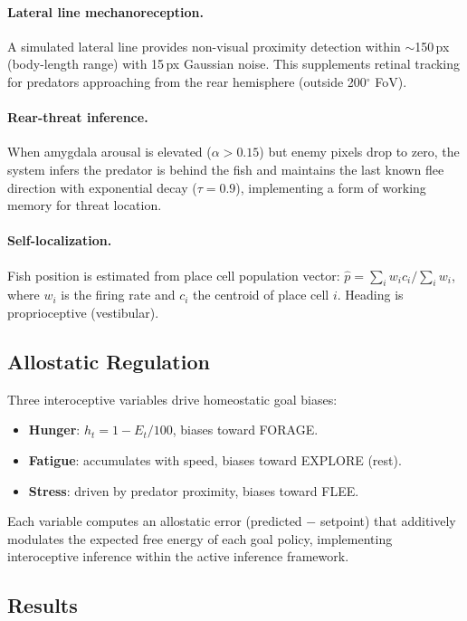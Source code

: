 \documentclass[9pt]{elife}
\begin{document}
\paragraph{Lateral line mechanoreception.}
A simulated lateral line provides non-visual proximity detection within
$\sim$150\,px (body-length range) with 15\,px Gaussian noise.
This supplements retinal tracking for predators approaching from
the rear hemisphere (outside 200$^\circ$ FoV).

\paragraph{Rear-threat inference.}
When amygdala arousal is elevated ($\alpha > 0.15$) but enemy pixels
drop to zero, the system infers the predator is behind the fish and
maintains the last known flee direction with exponential decay
($\tau = 0.9$), implementing a form of working memory for threat location.

\paragraph{Self-localization.}
Fish position is estimated from place cell population vector:
$\hat{p} = \sum_i w_i c_i / \sum_i w_i$,
where $w_i$ is the firing rate and $c_i$ the centroid of place cell $i$.
Heading is proprioceptive (vestibular).

\subsection{Allostatic Regulation}

Three interoceptive variables drive homeostatic goal biases:
\begin{itemize}
\item \textbf{Hunger}: $h_t = 1 - E_t / 100$, biases toward FORAGE.
\item \textbf{Fatigue}: accumulates with speed, biases toward EXPLORE (rest).
\item \textbf{Stress}: driven by predator proximity, biases toward FLEE.
\end{itemize}

Each variable computes an allostatic error (predicted $-$ setpoint)
that additively modulates the expected free energy of each goal policy,
implementing interoceptive inference within the active inference framework.

\subsection{Results}
\end{document}
